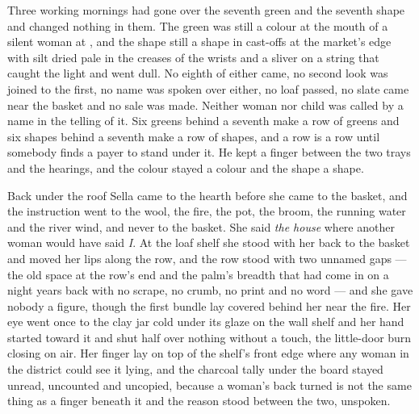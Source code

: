 Three working mornings had gone over the seventh green and the seventh shape and changed nothing in them. The green was still a colour at the mouth of a silent woman at , and the shape still a shape in cast-offs at the market's edge with silt dried pale in the creases of the wrists and a sliver on a string that caught the light and went dull. No eighth of either came, no second look was joined to the first, no name was spoken over either, no loaf passed, no slate came near the basket and no sale was made. Neither woman nor child was called by a name in the telling of it. Six greens behind a seventh make a row of greens and six shapes behind a seventh make a row of shapes, and a row is a row until somebody finds a payer to stand under it. He kept a finger between the two trays and the hearings, and the colour stayed a colour and the shape a shape.

Back under the roof Sella came to the hearth before she came to the basket, and the instruction went to the wool, the fire, the pot, the broom, the running water and the river wind, and never to the basket. She said \emph{the house} where another woman would have said \emph{I}. At the loaf shelf she stood with her back to the basket and moved her lips along the row, and the row stood with two unnamed gaps --- the old space at the row's end and the palm's breadth that had come in on a night years back with no scrape, no crumb, no print and no word --- and she gave nobody a figure, though the first bundle lay covered behind her near the fire. Her eye went once to the clay jar cold under its glaze on the wall shelf and her hand started toward it and shut half over nothing without a touch, the little-door burn closing on air. Her finger lay on top of the shelf's front edge where any woman in the district could see it lying, and the charcoal tally under the board stayed unread, uncounted and uncopied, because a woman's back turned is not the same thing as a finger beneath it and the reason stood between the two, unspoken.

